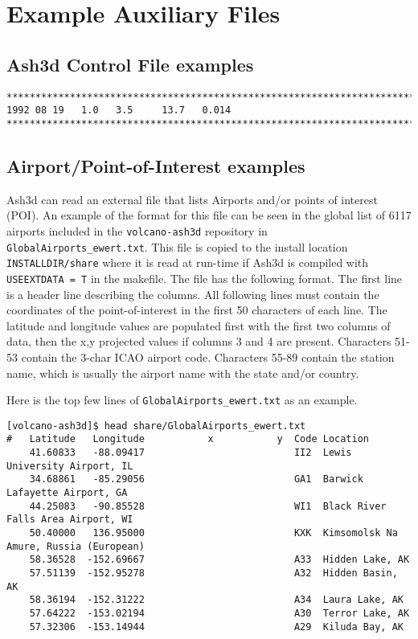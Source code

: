 \chapter{Example Auxiliary Files}\label{ChapAppendAuxFiles}
\section{Ash3d Control File examples}\label{ChapAppendSecInputFile}
\small
\begin{verbatim}
*******************************************************************************
1992 08 19   1.0   3.5     13.7   0.014
*******************************************************************************
\end{verbatim}
\normalsize

\section{Airport/Point-of-Interest examples}\label{ChapAppendSecPOI}
Ash3d can read an external file that lists Airports and/or points of interest (POI).
An example of the format for this file can be seen in the global list of
6117 airports included in the \texttt{volcano-ash3d} repository in
\texttt{GlobalAirports\_ewert.txt}. This file is copied to the install
location \texttt{INSTALLDIR/share} where it is read at run-time if Ash3d
is compiled with \texttt{USEEXTDATA = T} in the makefile. The file has the
following format. The first line is a header line describing the columns.
All following lines must contain the coordinates of the point-of-interest in
the first 50 characters of each line.
The latitude and longitude values are populated first with the first two columns
of data, then the x,y projected values if columns 3 and 4 are present.
Characters 51-53 contain the 3-char ICAO airport code. Characters 55-89 contain
the station name, which is usually the airport name with the state and/or
country.

Here is the top few lines of \texttt{GlobalAirports\_ewert.txt} as an example.
\footnotesize
\begin{verbatim}
[volcano-ash3d]$ head share/GlobalAirports_ewert.txt 
#   Latitude   Longitude           x           y  Code Location
    41.60833   -88.09417                          II2  Lewis University Airport, IL
    34.68861   -85.29056                          GA1  Barwick Lafayette Airport, GA
    44.25083   -90.85528                          WI1  Black River Falls Area Airport, WI
    50.40000   136.95000                          KXK  Kimsomolsk Na Amure, Russia (European)
    58.36528  -152.69667                          A33  Hidden Lake, AK
    57.51139  -152.95278                          A32  Hidden Basin, AK
    58.36194  -152.31222                          A34  Laura Lake, AK
    57.64222  -153.02194                          A30  Terror Lake, AK
    57.32306  -153.14944                          A29  Kiluda Bay, AK
\end{verbatim}
\normalsize

